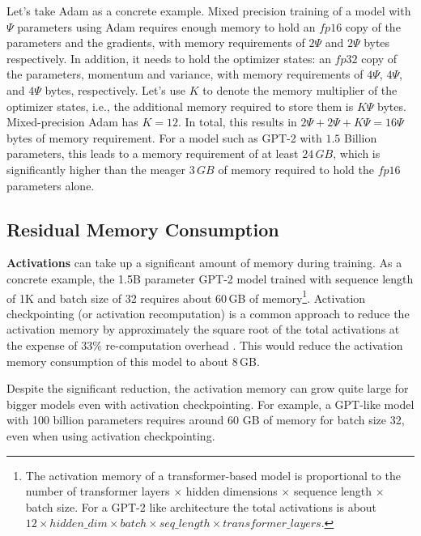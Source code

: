 Let's take Adam as a concrete example.  Mixed precision training of a model with $\Psi$ parameters using Adam requires enough memory to hold an $fp16$ copy of the parameters and the gradients, with memory requirements of $2\Psi$ and $2\Psi$ bytes respectively.  In addition, it needs to hold the optimizer states: an $fp32$ copy of the parameters, momentum and variance, with memory requirements of $4\Psi$, $4\Psi$, and $4\Psi$ bytes, respectively.  Let's use $K$ to denote the memory multiplier of the optimizer states, i.e., the additional memory required to store them is $K\Psi$ bytes. Mixed-precision Adam has $K=12$. In total, this results in $2\Psi + 2\Psi + K\Psi = 16\Psi$ bytes of memory requirement. 
For a model such as GPT-2 with $1.5$ Billion parameters, this leads to a memory requirement of at least $24\,GB$, which is significantly higher than the meager $3\,GB$ of memory required to hold the $fp16$ parameters alone.

\subsection{Residual Memory Consumption}
\textbf{Activations} can take up a significant amount of memory \cite{DBLP:journals/corr/ChenXZG16} during training.  As a concrete example, the 1.5B parameter GPT-2 model trained with sequence length of 1K and batch size of 32 requires about 60\,GB of memory\footnote{The activation memory of a transformer-based model is proportional to the number of transformer layers $\times$ hidden dimensions $\times$  sequence length $\times$ batch size.  For a GPT-2 like architecture the total activations is about  $12 \times hidden\_dim \times batch \times seq\_length \times transformer\_layers$.}.  Activation checkpointing (or activation recomputation) is a common approach to reduce the activation memory by approximately the square root of the total activations at the expense of $33\%$ re-computation overhead \cite{DBLP:journals/corr/ChenXZG16}. This would reduce the activation memory consumption of this model to about 8\,GB.

Despite the significant reduction, the activation memory can grow quite large for bigger models even with activation checkpointing. For example, a GPT-like model with 100 billion parameters requires around 60 GB of memory for batch size 32, even when using activation checkpointing.

